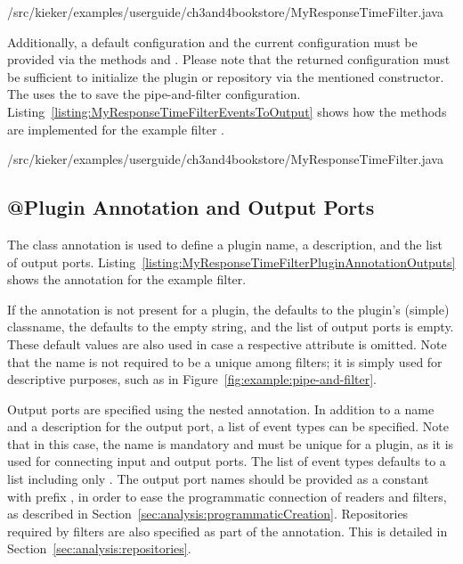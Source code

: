 \setJavaCodeListing
%
{\customComponentsBookstoreApplicationDir/src/kieker/examples/userguide/ch3and4bookstore/MyResponseTimeFilter.java}

\noindent Additionally, a default configuration and the %
current configuration must be provided via the methods  and %
. Please note that the returned configuration %
must be sufficient to initialize the plugin or repository via the mentioned constructor. %
The  uses the  to %
save the pipe-and-filter configuration. Listing~\ref{listing:MyResponseTimeFilterEventsToOutput} %
shows how the methods are implemented for the example filter . %

\setJavaCodeListing
%
{\customComponentsBookstoreApplicationDir/src/kieker/examples/userguide/ch3and4bookstore/MyResponseTimeFilter.java}


\subsection{@Plugin Annotation and Output Ports}\label{sec:analysis:pluginAnnotation}

\noindent The  class annotation is used to define a %
plugin name, a description, and the list of output ports. %
Listing~\ref{listing:MyResponseTimeFilterPluginAnnotationOutputs} shows the %
 annotation for the example filter.

If the  annotation is not present for a plugin, the  %
defaults to the plugin's (simple) classname, the  defaults %
to the empty string, and the list of output ports is empty. These default values %
are also used in case a respective attribute is omitted. %
Note that the name is not required to be a unique among filters; it is simply %
used for descriptive purposes, such as in Figure~\ref{fig:example:pipe-and-filter}. %

Output ports are specified using the nested  annotation. %
In addition to a name and a description for the output port, a list of event %
types can be specified. Note that in this case, the name is mandatory and must %
be unique for a plugin, as it is used for connecting input and output ports. %
The list of event types defaults to a list including only . %
The output port names should be provided as a  constant %
with prefix , in order to ease the programmatic %
connection of readers and filters, as described in %
Section~\ref{sec:analysis:programmaticCreation}. Repositories required by %
filters are also specified as part of the  annotation. %
This is detailed in Section~\ref{sec:analysis:repositories}. %

